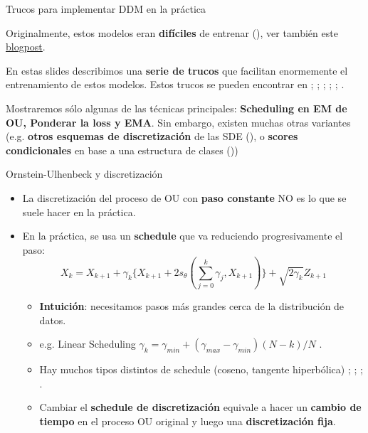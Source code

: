 \documentclass[aspectratio=169,xcolor=dvipsnames, t, spanish]{beamer}
\begin{document}
    
    \begin{frame}{Trucos para implementar DDM en la práctica}\vspace{-6mm}
    \begin{center}
        Originalmente, estos modelos eran \textbf{difíciles} de entrenar (\citet{SongErmon2019}), ver también este \href{https://yang-song.github.io/blog/2021/score/}{blogpost}. 
    \end{center}
    \pause
    \begin{center}
        En estas slides describimos una \textbf{serie de trucos} que facilitan enormemente el entrenamiento de estos modelos. Estos trucos se pueden encontrar en \citet{Song2020b}; \citet{SongErmon2020}; \citet{NicholDhariwal2021}; \citet{HoSalimans2021}; \citet{DeBortoli2021a}; \citet{Karras2022}.
    \end{center}
    \pause
    \begin{center}
        Mostraremos sólo algunas de las técnicas principales: \textbf{Scheduling en EM de OU, Ponderar la loss y EMA}. Sin embargo, existen muchas otras variantes (e.g. \textbf{otros esquemas de discretización} de las SDE (\cite{DurhamGallant2002, DeBortoli2021a}), o \textbf{scores condicionales} en base a una estructura de clases (\cite{Song2020b, HoSalimans2021, DhariwalNichol2021}))
    \end{center}
    \end{frame}
    
    \begin{frame}{Ornstein-Ulhenbeck y discretización}
        \begin{itemize}
            \item La discretización del proceso de OU con \textbf{paso constante} NO es lo que se suele hacer en la práctica.
            \item En la práctica, se usa un \textbf{schedule} que va reduciendo progresivamente el paso:
            \[ X_{k}=X_{k+1}+\gamma_{k}\{X_{k+1}+2s_{\theta}(\sum_{j=0}^{k}\gamma_{j},X_{k+1})\}+\sqrt{2\gamma_{k}}Z_{k+1} \]
            \begin{itemize}
            \pause
                \item \textbf{Intuición}: necesitamos pasos más grandes cerca de la distribución de datos.
                \item e.g. Linear Scheduling $\gamma_{k}=\gamma_{min}+(\gamma_{max}-\gamma_{min})(N-k)/N$ \cite{Song2020b}.
                \item Hay muchos tipos distintos de schedule (coseno, tangente hiperbólica) \citet{SongErmon2019}; \citet{Ho2020}; \citet{NicholDhariwal2021}; \citet{Karras2022}.
                \item Cambiar el \textbf{schedule de discretización} equivale a hacer un \textbf{cambio de tiempo} en el proceso OU original y luego una \textbf{discretización fija}.
            \end{itemize}
        \end{itemize}
    \end{frame}
    
\end{document}
